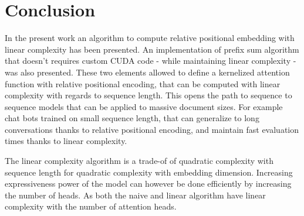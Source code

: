 \section{Conclusion}

In the present work an algorithm to compute
\citet{shaw2018selfattention} relative
positional embedding with linear complexity has been presented. An implementation of \citet{choromanski2021rethinking} prefix sum algorithm that doesn't requires custom CUDA code - while maintaining linear complexity - was also presented. These two elements allowed to define a kernelized attention function with relative positional encoding, that can be computed with linear complexity with regards to sequence length. This opens the path to sequence to sequence models that can be applied to massive document sizes. For example chat bots trained on small sequence length, that can generalize to long conversations thanks to relative positional encoding, and maintain fast evaluation times thanks to linear complexity.

The linear complexity algorithm is a trade-of of quadratic complexity with sequence length for quadratic complexity with embedding dimension. Increasing expressiveness power of the model can however be done efficiently by increasing the number of heads. As both the naive and linear algorithm have linear complexity with the number of attention heads.

\endinput
